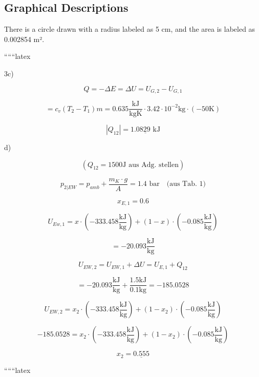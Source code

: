 \subsection*{Graphical Descriptions}

There is a circle drawn with a radius labeled as 5 cm, and the area is labeled as 0.002854 m².

``````latex


3c)

\[
Q = -\Delta E = \Delta U = U_{G,2} - U_{G,1}
\]

\[
= c_v (T_2 - T_1) m = 0.635 \frac{\text{kJ}}{\text{kgK}} \cdot 3.42 \cdot 10^{-2} \text{kg} \cdot (-50 \text{K})
\]

\[
|Q_{12}| = \underline{1.0829 \text{ kJ}}
\]

d)

\[
(Q_{12} = 1500 \text{J aus Adg. stellen})
\]

\[
p_{2|EW} = p_{amb} + \frac{m_{K} \cdot g}{A} = 1.4 \text{ bar} \quad \text{(aus Tab. 1)}
\]

\[
x_{E,1} = 0.6
\]

\[
U_{Ew,1} = x \cdot (-333.458 \frac{\text{kJ}}{\text{kg}}) + (1 - x) \cdot (-0.085 \frac{\text{kJ}}{\text{kg}})
\]

\[
= -20.093 \frac{\text{kJ}}{\text{kg}}
\]

\[
U_{EW,2} = U_{EW,1} + \Delta U = U_{E,1} + Q_{12}
\]

\[
= -20.093 \frac{\text{kJ}}{\text{kg}} + \frac{1.5 \text{kJ}}{0.1 \text{kg}} = -185.0528
\]

\[
U_{EW,2} = x_2 \cdot (-333.458 \frac{\text{kJ}}{\text{kg}}) + (1 - x_2) \cdot (-0.085 \frac{\text{kJ}}{\text{kg}})
\]

\[
-185.0528 = x_2 \cdot (-333.458 \frac{\text{kJ}}{\text{kg}}) + (1 - x_2) \cdot (-0.085 \frac{\text{kJ}}{\text{kg}})
\]

\[
x_2 = \underline{0.555}
\]

``````latex


